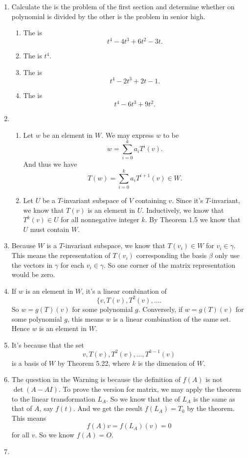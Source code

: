 \begin{enumerate}
\item Calculate the \charpoly{} is the problem of the first section and determine whether on polynomial is divided by the other is the problem in senior high.
\begin{enumerate}
\item The \charpoly{} is 
$${t}^{4}-4{t}^{3}+6{t}^{2}-3t.$$
\item The \charpoly{} is $t^4$.
\item The \charpoly{} is 
$${t}^{4}-2{t}^{3}+2t-1.$$
\item The \charpoly{} is 
$${t}^{4}-6{t}^{3}+9{t}^{2}.$$
\end{enumerate}
\item \begin{enumerate}
\item Let $w$ be an element in $W$. We may express $w$ to be 
\[w=\sum_{i=0}^k{a_iT^i(v)}.\]
And thus we have 
\[T(w)=\sum_{i=0}^k{a_iT^{i+1}(v)}\in W.\]
\item Let $U$ be a $T$-invariant subspace of $V$ containing $v$. Since it's $T$-invariant, we know that $T(v)$ is an element in $U$. Inductively, we know that $T^k(v)\in U$ for all nonnegative integer $k$. By Theorem 1.5 we know that $U$ must contain $W$.
\end{enumerate}
\item Because $W$ is a $T$-invariant subspace, we know that $T(v_i)\in W$ for $v_i\in \gamma$. This means the representation of $T(v_i)$ corresponding the basis $\beta$ only use the vectors in $\gamma$ for each $v_i\in \gamma$. So one corner of the matrix representation would be zero.
\item If $w$ is an element in $W$, it's a linear combination of 
\[\{v,T(v),T^2(v),\ldots .\]
So $w=g(T)(v)$ for some polynomial $g$. Conversely, if $w=g(T)(v)$ for some polynomial $g$, this means $w$ is a linear combination of the same set. Hence $w$ is an element in $W$.
\item It's because that the set 
\[v,T(v),T^2(v),\ldots ,T^{k-1}(v)\]
is a basis of $W$ by Theorem 5.22, where $k$ is the dimension of $W$.
\item The question in the Warning is because the definition of $f(A)$ is not $\det(A-AI)$. To prove the version for matrix, we may apply the theorem to the linear transformation $L_A$. So we know that the \charpoly{} of $L_A$ is the same as that of $A$, say $f(t)$. And we get the result $f(L_A)=T_0$ by the theorem. This means
\[f(A)v=f(L_A)(v)=0\]
for all $v$. So we know $f(A)=O$.
\item \begin{enumerate}

\end{enumerate}
\end{enumerate}
